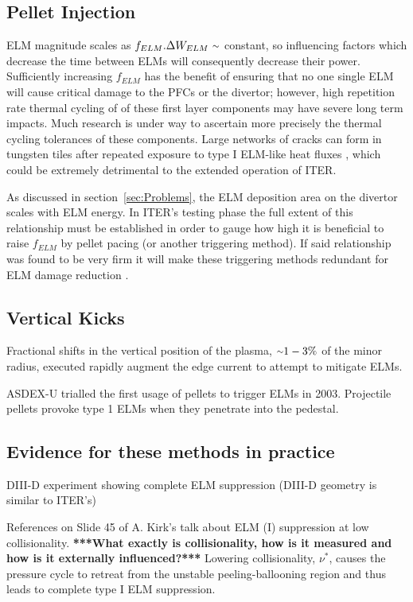 \documentclass[12pt]{article}  %
\providecommand{\squiggle}{\raise.17ex\hbox{$\scriptstyle\sim$}} %
\begin{document}
\subsection{Pellet Injection}\label{ssec:PInjection}
ELM magnitude scales as $f_{ELM}.\Delta W_{ELM}~\squiggle$ constant\cite{Loarte2002,Leonard1999,KirkFF}, so influencing factors which decrease the time between ELMs will consequently decrease their power. Sufficiently increasing $f_{ELM}$ has the benefit of ensuring that no one single ELM will cause critical damage to the PFCs or the divertor; however, high repetition rate thermal cycling of of these first layer components may have severe long term impacts. Much research is under way to ascertain more precisely the thermal cycling tolerances of these components. Large networks of cracks can form in tungsten tiles after repeated exposure to type I ELM-like heat fluxes \cite{Linke2011}, which could be extremely detrimental to the extended operation of ITER.

As discussed in section~\ref{sec:Problems}, the ELM deposition area on the divertor scales with ELM energy. In ITER's testing phase the full extent of this relationship must be established in order to gauge how high it is beneficial to raise $f_{ELM}$ by pellet pacing (or another triggering method). If said relationship was found to be very firm it will make these triggering methods redundant for ELM damage reduction \cite{Lang2013}.



\subsection{Vertical Kicks}\label{ssec:Vkicks}
Fractional shifts in the vertical position of the plasma, $\squiggle 1-3\%$ of the minor radius\cite{KirkFF}, executed rapidly augment the edge current to attempt to mitigate ELMs.\cite{DelaLuna2016}

ASDEX-U trialled the first usage of pellets to trigger ELMs in 2003.\cite{Lang2003} Projectile pellets provoke type 1 ELMs when they penetrate into the pedestal.\cite{KirkFF}

\subsection{Evidence for these methods in practice}\label{ssec:EIP}
DIII-D experiment showing complete ELM suppression (DIII-D geometry is similar to ITER's)\cite{Mordijck2011}

References on Slide 45 of A. Kirk's talk about ELM (I) suppression at low collisionality. \textbf{***What exactly is collisionality, how is it measured and how is it externally influenced?***} Lowering collisionality, $\nu^{*}$, causes the pressure cycle to retreat from the unstable peeling-ballooning region and thus leads to complete type I ELM suppression.\cite{Evans2008}
\end{document}
